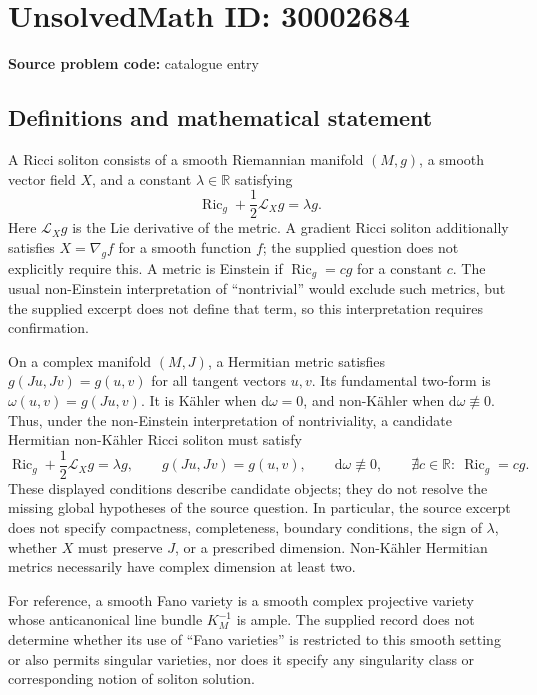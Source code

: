 \documentclass[11pt]{article}
\newcommand{\R}{\mathbb{R}}
\begin{document}
\section*{UnsolvedMath ID: 30002684}
\textbf{Source problem code:} catalogue entry
\subsection{Definitions and mathematical statement}
A Ricci soliton consists of a smooth Riemannian manifold $(M,g)$, a smooth vector field $X$, and a constant $\lambda\in\R$ satisfying
\[
\operatorname{Ric}_g+\frac12\mathcal L_Xg=\lambda g.
\]
Here $\mathcal L_Xg$ is the Lie derivative of the metric. A gradient Ricci soliton additionally satisfies $X=\nabla_g f$ for a smooth function $f$; the supplied question does not explicitly require this. A metric is Einstein if $\operatorname{Ric}_g=cg$ for a constant $c$. The usual non-Einstein interpretation of ``nontrivial'' would exclude such metrics, but the supplied excerpt does not define that term, so this interpretation requires confirmation.

On a complex manifold $(M,J)$, a Hermitian metric satisfies $g(Ju,Jv)=g(u,v)$ for all tangent vectors $u,v$. Its fundamental two-form is $\omega(u,v)=g(Ju,v)$. It is K\"ahler when $\mathrm d\omega=0$, and non-K\"ahler when $\mathrm d\omega\not\equiv0$. Thus, under the non-Einstein interpretation of nontriviality, a candidate Hermitian non-K\"ahler Ricci soliton must satisfy
\[
\operatorname{Ric}_g+\frac12\mathcal L_Xg=\lambda g,
\qquad g(Ju,Jv)=g(u,v),
\qquad \mathrm d\omega\not\equiv0,
\qquad \nexists c\in\R:\ \operatorname{Ric}_g=cg.
\]
These displayed conditions describe candidate objects; they do not resolve the missing global hypotheses of the source question. In particular, the source excerpt does not specify compactness, completeness, boundary conditions, the sign of $\lambda$, whether $X$ must preserve $J$, or a prescribed dimension. Non-K\"ahler Hermitian metrics necessarily have complex dimension at least two.

For reference, a smooth Fano variety is a smooth complex projective variety whose anticanonical line bundle $K_M^{-1}$ is ample. The supplied record does not determine whether its use of ``Fano varieties'' is restricted to this smooth setting or also permits singular varieties, nor does it specify any singularity class or corresponding notion of soliton solution.
\end{document}
